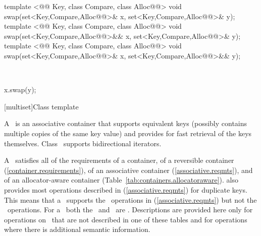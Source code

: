 \documentclass[american,twoside]{book}
\begin{document}
\begin{itemdecl}
template <@@ Key, class Compare, class Alloc@@>
  void swap(set<Key,Compare,Alloc@@>& x,
            set<Key,Compare,Alloc@@>& y);
template <@@ Key, class Compare, class Alloc@@>
  void swap(set<Key,Compare,Alloc@@>&& x,
            set<Key,Compare,Alloc@@>& y);
template <@@ Key, class Compare, class Alloc@@>
  void swap(set<Key,Compare,Alloc@@>& x,
            set<Key,Compare,Alloc@@>&& y);
\end{itemdecl}

\begin{itemdescr}
\pnum
\effects\ 
\begin{codeblock}
x.swap(y);
\end{codeblock}
\end{itemdescr}

[multiset]{Class template }

\pnum
{}%
A
\
is an associative container that supports equivalent keys (possibly contains multiple copies of
the same key value) and provides for fast retrieval of the keys themselves.
Class
\tcode{multiset}\
supports bidirectional iterators.

\pnum
A
\
satisfies all of the requirements of a container, of a reversible container
(\ref{container.requirements}), of
an associative container (\ref{associative.reqmts}), and of an allocator-aware container (Table~\ref{tab:containers.allocatoraware}).
also provides most operations described in
(\ref{associative.reqmts})
for duplicate keys.
This means that a
\tcode{multiset}\
supports the
\tcode{a_eq}\
operations in
(\ref{associative.reqmts})
but not the
\tcode{a_uniq}\
operations.
For a
\
both the
\
and
\tcode{value_type}\
are
\tcode{Key}.
Descriptions are provided here only for operations on
\
that are not described in one of these tables
and for operations where there is additional semantic information.
\end{document}

